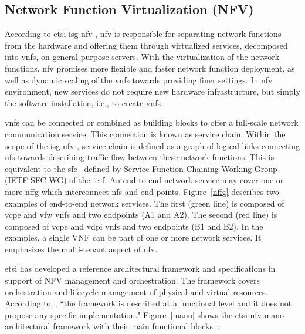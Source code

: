 \subsection{Network Function Virtualization (NFV)}
\label{subsec:nfv}

According to \gls{etsi} \gls{isg} \gls{nfv} \cite{ETSIIndustrySpecificationGroupISGNFV2014NetworkNFV},  \acrlong{nfv} is responsible for separating network functions from the hardware and offering them through virtualized services, decomposed into \glspl{vnf}, on general purpose servers. With the virtualization of the network functions, \gls{nfv} promises more flexible and faster network function deployment, as well as dynamic scaling of the \glspl{vnf} towards providing finer settings. In \gls{nfv} environment, new services do not require new hardware infrastructure, but simply the software installation, i.e., to create \glspl{vnf}.

\glspl{vnf} can be connected or combined as building blocks to offer a full-scale network communication service. This connection is known as service chain. Within the scope of the \gls{isg} \gls{nfv} \cite{ETSIIndustrySpecificationGroupISGNFV2014NetworkNFV}, service chain is defined as a graph of logical links connecting \glspl{nf} towards describing traffic flow between these network functions. This is equivalent to the \gls{sfc}~\cite{Halpern2015} defined by Service Function Chaining Working Group (IETF SFC WG) of the \gls{ietf}.  
An end-to-end network service may cover one or more \gls{nffg} which interconnect \glspl{nf} and end points.  Figure~\ref{nffg} describes two examples of end-to-end network services. The first (green line) is composed of \gls{vcpe} and \gls{vfw} \glspl{vnf} and two endpoints (A1 and A2). The second (red line) is composed of \gls{vcpe} and \gls{vdpi} \glspl{vnf} and two endpoints (B1 and B2). In the examples, a single VNF can be part of one or more network services. It emphasizes the multi-tenant aspect of \gls{nfv}.

\gls{etsi} has developed a reference architectural framework and specifications in support of NFV management and orchestration. The framework covers orchestration and lifecycle management of physical and virtual resources. According to~\cite{ETSIIndustrySpecificationGroupISGNFV2013NetworkFramework}, ``the framework is described at a functional level and it does not propose any specific implementation." Figure~\ref{mano} shows the \gls{etsi} \gls{nfv}-\acrfull{mano} architectural framework with their main functional blocks~\cite{ETSIIndustrySpecificationGroupISGNFV2014NetworkOptions}:

